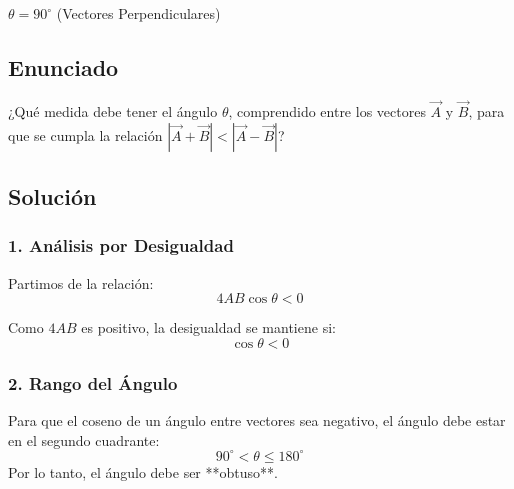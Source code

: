 \documentclass[12pt, a4paper]{article}
\begin{document}
\begin{tcolorbox}[colback=green!5!white, colframe=green!50!black, title=Respuesta Final]
\centering \Large $\theta = 90^\circ$ (Vectores Perpendiculares)
\end{tcolorbox}

\newpage

\subsection*{Enunciado}
¿Qué medida debe tener el ángulo $\theta$, comprendido entre los vectores $\vec{A}$ y $\vec{B}$, para que se cumpla la relación $|\vec{A} + \vec{B}| < |\vec{A} - \vec{B}|$?

\begin{center}
\end{center}

\subsection*{Solución}

\subsubsection*{1. Análisis por Desigualdad}
Partimos de la relación:
\begin{equation*}
    4AB\cos\theta < 0
\end{equation*}

Como $4AB$ es positivo, la desigualdad se mantiene si:
\begin{equation*}
    \cos\theta < 0
\end{equation*}

\subsubsection*{2. Rango del Ángulo}
Para que el coseno de un ángulo entre vectores sea negativo, el ángulo debe estar en el segundo cuadrante:
\begin{equation*}
    90^\circ < \theta \le 180^\circ
\end{equation*}
Por lo tanto, el ángulo debe ser **obtuso**.
\end{document}
